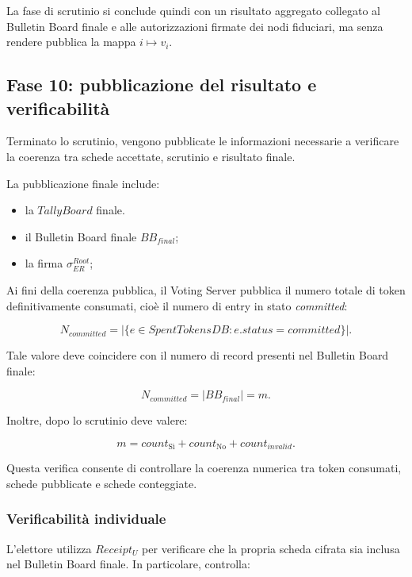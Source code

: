 \documentclass[a4paper,12pt]{article}
\begin{document}
La fase di scrutinio si conclude quindi con un risultato aggregato collegato al Bulletin Board finale e alle autorizzazioni firmate dei nodi fiduciari, ma senza rendere pubblica la mappa \(i \mapsto v_i\).


\subsection{Fase 10: pubblicazione del risultato e verificabilit\`a}

Terminato lo scrutinio, vengono pubblicate le informazioni necessarie a verificare la coerenza tra schede accettate, scrutinio e risultato finale.

La pubblicazione finale include:

\begin{itemize}
	\item la $TallyBoard$ finale.
	\item il Bulletin Board finale \(BB_{final}\);
	\item la firma \(\sigma_{ER}^{Root}\);
\end{itemize}

Ai fini della coerenza pubblica, il Voting Server pubblica il numero totale di token definitivamente consumati, cio\`e il numero di entry in stato \emph{committed}:

\[
	N_{committed} =
	|\{e \in SpentTokensDB : e.status = committed\}|.
\]

Tale valore deve coincidere con il numero di record presenti nel Bulletin Board finale:

\[
	N_{committed} = |BB_{final}| = m.
\]

Inoltre, dopo lo scrutinio deve valere:

\[
	m = count_{\text{S\`i}} + count_{\text{No}} + count_{invalid}.
\]

Questa verifica consente di controllare la coerenza numerica tra token consumati, schede pubblicate e schede conteggiate.

\subsubsection{Verificabilit\`a individuale}

L'elettore utilizza \(Receipt_U\) per verificare che la propria scheda cifrata sia inclusa nel Bulletin Board finale.
In particolare, controlla:
\end{document}
